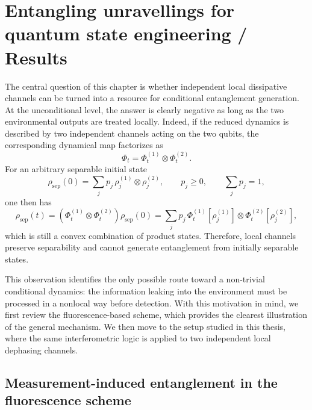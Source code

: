 \chapter{Entangling unravellings for quantum state engineering / Results}

The central question of this chapter is whether independent local dissipative channels can be turned into a resource for conditional entanglement generation. At the unconditional level, the answer is clearly negative as long as the two environmental outputs are treated locally. Indeed, if the reduced dynamics is described by two independent channels acting on the two qubits, the corresponding dynamical map factorizes as
\begin{equation}
	\Phi_t = \Phi_t^{(1)} \otimes \Phi_t^{(2)}.
	\label{eq:chapter3_local_channel_factorization}
\end{equation}
For an arbitrary separable initial state
\begin{equation}
	\rho_{\mathrm{sep}}(0)
	=
	\sum_j p_j\,\rho_j^{(1)} \otimes \rho_j^{(2)},
	\qquad
	p_j \geq 0,
	\qquad
	\sum_j p_j = 1,
	\label{eq:chapter3_generic_separable_state}
\end{equation}
one then has
\begin{equation}
	\rho_{\mathrm{sep}}(t)
	=
	(\Phi_t^{(1)} \otimes \Phi_t^{(2)})\rho_{\mathrm{sep}}(0)
	=
	\sum_j p_j\,\Phi_t^{(1)}[\rho_j^{(1)}]\otimes \Phi_t^{(2)}[\rho_j^{(2)}],
	\label{eq:chapter3_local_maps_preserve_separability}
\end{equation}
which is still a convex combination of product states. Therefore, local channels preserve separability and cannot generate entanglement from initially separable states.

This observation identifies the only possible route toward a non-trivial conditional dynamics: the information leaking into the environment must be processed in a nonlocal way before detection. 
With this motivation in mind, we first review the fluorescence-based scheme, which provides the clearest illustration of the general mechanism. We then move to the setup studied in this thesis, where the same interferometric logic is applied to two independent local dephasing channels.

\section{Measurement-induced entanglement in the fluorescence scheme}
\label{sec:lewalle_fluorescence_review}

